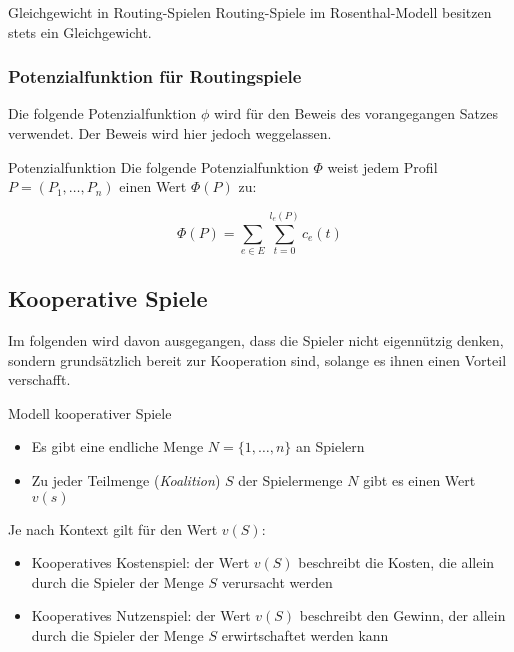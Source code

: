 \documentclass{panikzettel}
\begin{document}
{\begin{halfboxr}
\begin{theo}{Gleichgewicht in Routing-Spielen}
		Routing-Spiele im Rosenthal-Modell besitzen stets ein Gleichgewicht.
	\end{theo}
\end{halfboxr}

\subsubsection{Potenzialfunktion für Routingspiele}

Die folgende Potenzialfunktion $\phi$ wird für den Beweis des vorangegangen Satzes verwendet. Der Beweis wird hier jedoch weggelassen.

\begin{defi}{Potenzialfunktion}
	Die folgende Potenzialfunktion $\Phi $ weist jedem Profil $P = (P_1, \dots , P_n)$ einen Wert $\Phi (P)$ zu:
	
	\[\Phi (P) = \sum_{e \in E} \sum_{t = 0 }^{l_e(P)} c_e(t) \]
\end{defi}


\subsection{Kooperative Spiele}
Im folgenden wird davon ausgegangen, dass die Spieler nicht eigennützig denken, sondern grundsätzlich bereit zur Kooperation sind, solange es ihnen einen Vorteil verschafft.

\begin{defi}{Modell kooperativer Spiele}
	\begin{itemize} 
	\item Es gibt eine endliche Menge $N = \{1, \dots , n\}$ an Spielern
	\item Zu jeder Teilmenge (\emph{Koalition}) $S$ der Spielermenge $N$ gibt es einen Wert $v(s)$
	\end{itemize}

	Je nach Kontext gilt für den Wert $v(S)$:
	
	\begin{itemize}
		\item Kooperatives Kostenspiel: der Wert $v(S)$ beschreibt die Kosten, die allein durch die Spieler der Menge $S$ verursacht werden
		\item Kooperatives Nutzenspiel: der Wert $v(S)$ beschreibt den Gewinn, der allein durch die Spieler der Menge $S$ erwirtschaftet werden kann
	\end{itemize}
\end{defi}

}
\end{document}
